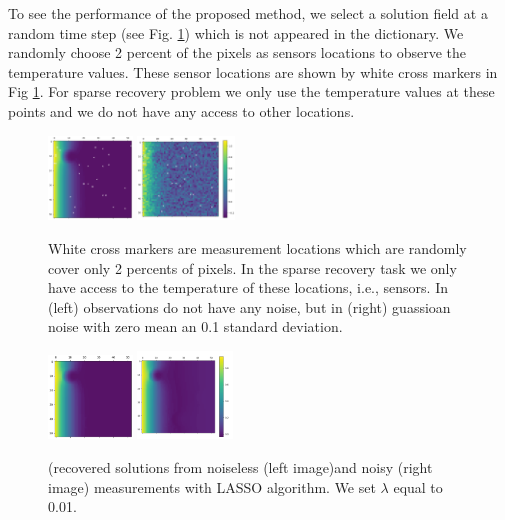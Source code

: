 \documentclass[conference]{IEEEtran}
\begin{document}
To see the performance of the proposed method, we select a solution field at a random time step (see Fig. \ref{fig::sensor-heat}) which is not appeared in the dictionary. We randomly choose 2 percent of the pixels as sensors locations to observe the temperature values. These sensor locations are shown by white cross markers in Fig \ref{fig::sensor-heat}. For sparse recovery problem we only use the temperature values at these points and we do not have any access to other locations. 


\begin{figure}[!ht]
  \centering
  \includegraphics[width=0.2\textwidth]{figure/sensor-heat.png}
    \hspace{0.01\textwidth}
    \includegraphics[width=0.23\textwidth]{figure/sensor-heat-noisy.png}
  \caption{White cross markers are measurement locations which are randomly cover only 2 percents of pixels. In the sparse recovery task we only have access to the temperature of these locations, i.e., sensors. In (left) observations do not have any noise, but in (right) guassioan noise with zero mean an 0.1 standard deviation.}\label{fig::sensor-heat}
\end{figure}




\begin{figure}[!ht]
  \centering
  \includegraphics[width=0.2\textwidth]{figure/2d_rec_lasso.png}
    \hspace{0.01\textwidth}
    \includegraphics[width=0.225\textwidth]{figure/2d_rec_lasso_noisy.png}
  \caption{(recovered solutions from noiseless (left image)and noisy (right image) measurements with LASSO algorithm. We set $\lambda$ equal to  0.01.}\label{fig::recon-2D}
\end{figure}
\end{document}
